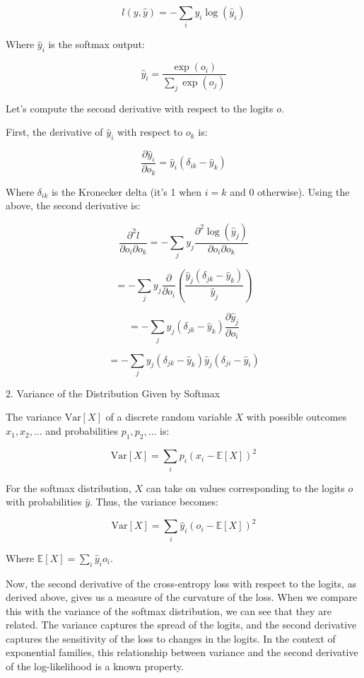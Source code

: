 \[ l(y, \hat{y}) = - \sum_{i} y_i \log(\hat{y}_i) \]

Where \( \hat{y}_i \) is the softmax output:

\[ \hat{y}_i = \frac{\exp(o_i)}{\sum_j \exp(o_j)} \]

Let's compute the second derivative with respect to the logits \( o \).

First, the derivative of \( \hat{y}_i \) with respect to \( o_k \) is:

\[ \frac{\partial \hat{y}_i}{\partial o_k} = \hat{y}_i (\delta_{ik} - \hat{y}_k) \]

Where \( \delta_{ik} \) is the Kronecker delta (it's 1 when \( i = k \) and 0 otherwise).
Using the above, the second derivative is:

\[ \frac{\partial^2 l}{\partial o_i \partial o_k} = -\sum_j y_j \frac{\partial^2 \log(\hat{y}_j)}{\partial o_i \partial o_k} \]

\[ = -\sum_j y_j \frac{\partial}{\partial o_i} \left( \frac{\hat{y}_j (\delta_{jk} - \hat{y}_k)}{\hat{y}_j} \right) \]

\[ = -\sum_j y_j (\delta_{jk} - \hat{y}_k) \frac{\partial \hat{y}_j}{\partial o_i} \]

\[ = -\sum_j y_j (\delta_{jk} - \hat{y}_k) \hat{y}_j (\delta_{ji} - \hat{y}_i) \]

2. Variance of the Distribution Given by Softmax

The variance \( \text{Var}[X] \) of a discrete random variable \( X \) with possible outcomes \( x_1, x_2, \ldots \) and probabilities \( p_1, p_2, \ldots \) is:

\[ \text{Var}[X] = \sum_i p_i (x_i - \mathbb{E}[X])^2 \]

For the softmax distribution, \( X \) can take on values corresponding to the logits \( o \) with probabilities \( \hat{y} \). Thus, the variance becomes:

\[ \text{Var}[X] = \sum_i \hat{y}_i (o_i - \mathbb{E}[X])^2 \]

Where \( \mathbb{E}[X] = \sum_i \hat{y}_i o_i \).

Now, the second derivative of the cross-entropy loss with respect to the logits, as derived above, gives us a measure of the curvature of the loss.
When we compare this with the variance of the softmax distribution, we can see that they are related. The variance captures the spread of the logits, and the second derivative captures the sensitivity of the loss to changes in the logits. In the context of exponential families, this relationship between variance and the second derivative of the log-likelihood is a known property.

